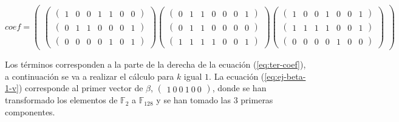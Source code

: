 \begin{equation}\label{eq:ej-coef}
	{coef} =
	\left(\begin{matrix}
		\left(\begin{matrix}
			\left(\begin{smallmatrix}1 & 0 & 0 & 1 & 1 & 0 & 0\end{smallmatrix}\right)\\
			\left(\begin{smallmatrix}0 & 1 & 1 & 0 & 0 & 0 & 1\end{smallmatrix}\right)\\
			\left(\begin{smallmatrix}0 & 0 & 0 & 0 & 1 & 0 & 1\end{smallmatrix}\right)
		\end{matrix}\right)
		\left(\begin{matrix}
			\left(\begin{smallmatrix}0 & 1 & 1 & 0 & 0 & 0 & 1\end{smallmatrix}\right)\\
			\left(\begin{smallmatrix}0 & 1 & 1 & 0 & 0 & 0 & 0\end{smallmatrix}\right)\\
			\left(\begin{smallmatrix}1 & 1 & 1 & 1 & 0 & 0 & 1\end{smallmatrix}\right)
		\end{matrix}\right)
		\left(\begin{matrix}
			\left(\begin{smallmatrix}1 & 0 & 0 & 1 & 0 & 0 & 1\end{smallmatrix}\right)\\
			\left(\begin{smallmatrix}1 & 1 & 1 & 1 & 0 & 0 & 1\end{smallmatrix}\right)\\
			\left(\begin{smallmatrix}0 & 0 & 0 & 0 & 1 & 0 & 0\end{smallmatrix}\right)
		\end{matrix}\right)
	\end{matrix}\right)
\end{equation}

Los términos corresponden a la parte de la derecha de la ecuación (\ref{eq:ter-coef}), a continuación se va a realizar el cálculo para $k$ igual $1$. La ecuación (\ref{eq:ej-beta-1-v}) corresponde al primer vector de $\beta$, $\left(\begin{array}{c}1\ 0\ 0\ 1\ 0\ 0\end{array}\right)$, donde se han transformado los elementos de $\mathds{F}_2$ a $\mathds{F}_{128}$ y se han tomado las $3$ primeras componentes.

